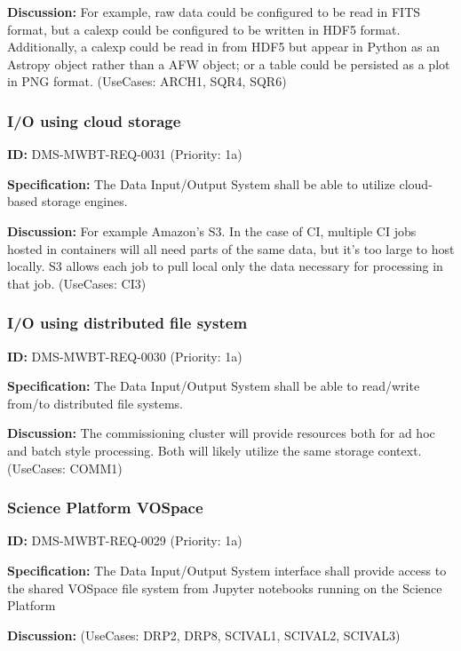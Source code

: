 \documentclass[SE,toc,lsstdraft]{lsstdoc}
\begin{document}
\textbf{Discussion:}
For example, raw data could be configured to be read in FITS format, but a calexp could be configured to be written in HDF5 format. Additionally, a calexp could be read in from HDF5 but appear in Python as an Astropy object rather than a AFW object; or a table could be persisted as a plot in PNG format. (UseCases: ARCH1, SQR4, SQR6)

\subsubsection{I/O using cloud storage}

\label{DMS-MWBT-REQ-0031}
\textbf{ID:} DMS-MWBT-REQ-0031 (Priority: 1a)

\textbf{Specification:}
The Data Input/Output System shall be able to utilize cloud-based storage engines.

\textbf{Discussion:}
For example Amazon's S3. In the case of CI, multiple CI jobs hosted in containers will all need parts of the same data, but it's too large to host locally. S3 allows each job to pull local only the data necessary for processing in that job. (UseCases: CI3)

\subsubsection{I/O using distributed file system}

\label{DMS-MWBT-REQ-0030}
\textbf{ID:} DMS-MWBT-REQ-0030 (Priority: 1a)

\textbf{Specification:}
The Data Input/Output System shall be able to read/write from/to distributed file systems.

\textbf{Discussion:}
The commissioning cluster will provide resources both for ad hoc and batch style processing. Both will likely utilize the same storage context. (UseCases: COMM1)

\subsubsection{Science Platform VOSpace}

\label{DMS-MWBT-REQ-0029}
\textbf{ID:} DMS-MWBT-REQ-0029 (Priority: 1a)

\textbf{Specification:}
The Data Input/Output System interface shall provide access to the shared VOSpace file system from Jupyter notebooks running on the Science Platform

\textbf{Discussion:}
(UseCases: DRP2, DRP8, SCIVAL1, SCIVAL2, SCIVAL3)
\end{document}
